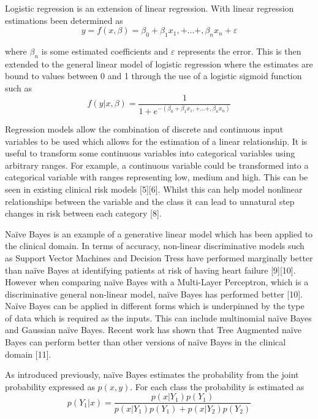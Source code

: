 \documentclass[a4paper,UKenglish]{oasics-v2016}
\begin{document}
Logistic regression is an extension of linear regression. With linear regression estimations been determined as
\begin{equation}
y = f(x,\beta) = \beta_0 + \beta_1 x_1, + ... +, \beta_n x_n + \varepsilon 
\end{equation}

where $\beta_n$ is some estimated coefficients and $\varepsilon$ represents the error. This is then extended to the general linear model of logistic regression where the estimates are bound to values between 0 and 1 through the use of a logistic sigmoid function such as
\begin{equation}
f(y|x,\beta) = \frac{1}{1 + e^{-(\beta_0 + \beta_1 x_1, + ... +, \beta_n x_n)}}
\end{equation}


Regression models allow the combination of discrete and continuous input variables to be used which allows for the estimation of a linear relationship. It is useful to transform some continuous variables into categorical variables using arbitrary ranges. For example, a continuous variable could be transformed into a categorical variable with ranges representing low, medium and high. This can be seen in existing clinical risk models [5][6].  Whilst this can help model nonlinear relationships between the variable and the class it can lead to unnatural step changes in risk between each category [8].

Naïve Bayes is an example of a generative linear model which has been applied to the clinical domain. In terms of accuracy, non-linear discriminative models such as Support Vector Machines and Decision Tress have performed marginally better than naïve Bayes at identifying patients at risk of having heart failure [9][10]. However when comparing naïve Bayes with a Multi-Layer Perceptron, which is a discriminative general non-linear model, naïve Bayes has performed better [10]. Naïve Bayes can be applied in different forms which is underpinned by the type of data which is required as the inputs. This can include multinomial naïve Bayes and Gaussian naïve Bayes. Recent work has shown that Tree Augmented naïve Bayes can perform better than other versions of naïve Bayes in the clinical domain [11].

As introduced previously, naïve Bayes estimates the probability from the joint probability expressed as $p(x,y)$. For each class the probability is estimated as
\begin{equation}
p(Y_1|x) = \frac {p(x|Y_1)p(Y_1)} { p(x|Y_1)p(Y_1) + p(x|Y_2)p(Y_2) }
\end{equation}
\end{document}
